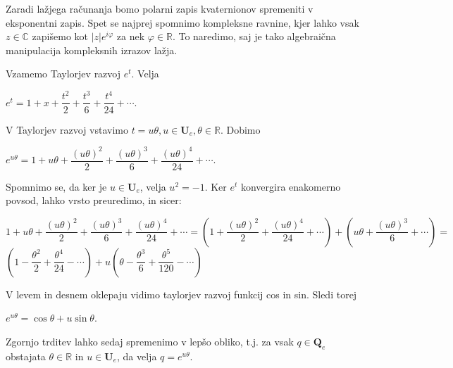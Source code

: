 \documentclass[a4paper,12pt]{article}
\def\R{\mathbb{R}} %
\def\C{\mathbb{C}} %
\def\H{\mathbb{H}} %
\def\Qe{\textbf{Q}_{e}} %
\def\Ue{\textbf{U}_{e}} %
\def\qed{$\hfill\Box$}   %
\begin{document}



Zaradi lažjega računanja bomo polarni zapis kvaternionov spremeniti v eksponentni zapis. Spet se najprej spomnimo kompleksne ravnine, kjer lahko
vsak $z \in \C$ zapišemo kot $|z|e^{i\varphi}$ za nek $\varphi \in \R$. To naredimo, saj je tako
algebraična manipulacija kompleksnih izrazov lažja.

Vzamemo Taylorjev razvoj $e^t$. Velja
\begin{center}
   $e^t = 1+x+\dfrac{t^2}{2}+\dfrac{t^3}{6}+\dfrac{t^4}{24} + \cdots$.
\end{center}
V Taylorjev razvoj vstavimo $t = u\theta, u \in \Ue, \theta \in \R$. Dobimo %
\begin{center}
   $e^{u\theta} = 1 + u\theta + \dfrac{(u\theta)^2}{2} + \dfrac{(u\theta)^3}{6} + \dfrac{(u\theta)^4}{24} + \cdots$.
\end{center}
Spomnimo se, da ker je $u \in \Ue$, velja $u^2=-1$. Ker $e^t$ konvergira enakomerno povsod, lahko vrsto preuredimo, in sicer:
\begin{center}
   $1 + u\theta + \dfrac{(u\theta)^2}{2} + \dfrac{(u\theta)^3}{6} + \dfrac{(u\theta)^4}{24} + \cdots = (1 + \dfrac{(u\theta)^2}{2} + \dfrac{(u\theta)^4}{24}+ \cdots) + (u\theta + \dfrac{(u\theta)^3}{6} + \cdots) = $
   $(1-\dfrac{\theta^2}{2}+\dfrac{\theta^4}{24}- \cdots) + u(\theta - \dfrac{\theta^3}{6} +\dfrac{\theta^5}{120} - \cdots)$
\end{center}
V levem in desnem oklepaju vidimo taylorjev razvoj funkcij cos in sin. Sledi torej
\begin{center}
   $e^{u\theta} = \cos\theta  + u\sin\theta$.
\end{center}
Zgornjo trditev lahko sedaj spremenimo v lepšo obliko, t.j. za vsak $q \in \Qe$ obstajata
$\theta \in \R$ in $u \in \Ue$, da velja $q =  e^{u\theta}$.
\end{document}
